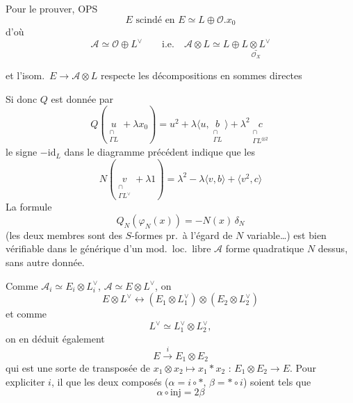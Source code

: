 \documentclass[11pt,a4paper]{article}
\begin{document}
Pour le prouver, OPS
\[
  E \text{ scindé en } E \simeq L \oplus \mathcal{O}.x_0
\]
d'où
\[
  \mathcal{A} \simeq \mathcal{O} \oplus L^{\vee} \qquad \text{i.e.} \quad \mathcal{A} \otimes L \simeq L \oplus \underset{\mathcal{O}_X}{\underline{L \otimes L^{\vee}}}
\]

et l'isom.\ $E \to \mathcal{A} \otimes L$ respecte les décompositions en sommes directes



Si donc $Q$ est donnée par
\[
  Q(\underset{\substack{\cap \\ \Gamma L}}{u} + \lambda x_0) = u^2 + \lambda \langle u, \underset{\substack{\cap \\ \Gamma L}}{b} \rangle + \lambda^2 \underset{\substack{\cap \\ \Gamma L^{\otimes 2}}}{c}
\]
le signe $-\mathrm{id}_L$ dans le diagramme précédent indique que les 
\[
  N(\underset{\substack{\cap \\ \Gamma L^{\vee}}}{v} + \lambda 1) = \lambda^2 - \lambda \langle v, b \rangle + \langle v^2, c \rangle
\]
La formule
\[
  \boxed{Q_N(\varphi_N(x)) = -N(x)\, \delta_N}
\]
(les deux membres sont des $S$-formes pr.\ à l'égard \struck{\ill{}} de $N$ variable…) est bien vérifiable dans le   générique d'un mod.\ loc.\ libre $\mathcal{A}$   forme quadratique \struck{\ill{}} $N$ dessus, sans autre donnée.

Comme $\mathcal{A}_i \simeq E_i \otimes L_i^{\vee}$, $\mathcal{A} \simeq E \otimes L^{\vee}$, on 
\[
  E \otimes L^{\vee} \longleftrightarrow (E_1 \otimes L_1^{\vee}) \otimes (E_2 \otimes L_2^{\vee})
\]
et comme
\[
  L^{\vee} \simeq L_1^{\vee} \otimes L_2^{\vee} ,
\]
on en déduit également
\[
  E \xrightarrow{\ i\ } E_1 \otimes E_2
\]
qui est une sorte de transposée de $x_1 \otimes x_2 \mapsto x_1 * x_2$ : $E_1 \otimes E_2 \to E$. Pour expliciter $i$, il  que les deux composés ($\alpha = i \circ *$, $\beta = * \circ i$) soient tels que
\[
  \alpha \circ \mathrm{inj} = 2\beta
\]
\end{document}
